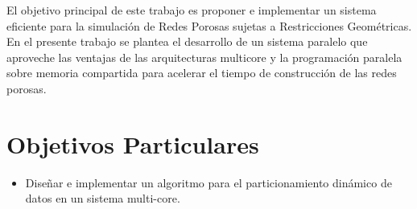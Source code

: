 El objetivo principal de  este trabajo es proponer e implementar un sistema eficiente para la simulación de Redes Porosas sujetas a Restricciones Geométricas.  En el presente trabajo se plantea el desarrollo de un sistema paralelo que aproveche las ventajas de las arquitecturas multicore y la programación paralela sobre memoria compartida para acelerar el tiempo de construcción de las redes porosas.

\section{Objetivos Particulares}
\label{sec:objetivosp}
\begin{itemize}


\item {Diseñar e implementar un algoritmo para el particionamiento dinámico de datos en un sistema multi-core}.


\end{itemize}
